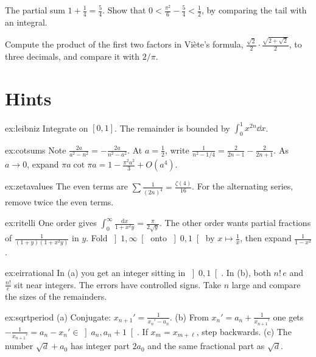 \begin{exercise}[$\star\star$]\label{ex:rw03c}
The partial sum $1+\frac14=\frac54$. Show that $0<\frac{\pi^2}6-\frac54<\frac12$, by comparing the tail with an integral.
\end{exercise}

\begin{exercise}[$\star\star\star$]\label{ex:rw03d}
Compute the product of the first two factors in Vi\`ete's formula, $\frac{\sqrt2}2\cdot\frac{\sqrt{2+\sqrt2}}2$, to three decimals, and compare it with $2/\pi$.
\end{exercise}

\section{Hints}

\begin{hint}{ex:leibniz}
Integrate on $[0,1]$. The remainder is bounded by $\int_0^1x^{2n}\dd x$.
\end{hint}
\begin{hint}{ex:cotsums}
Note $\frac{2a}{a^2-n^2}=-\frac{2a}{n^2-a^2}$. At $a=\frac12$, write $\frac1{n^2-1/4}=\frac2{2n-1}-\frac2{2n+1}$. As $a\to0$, expand $\pi a\cot\pi a=1-\frac{\pi^2a^2}3+O(a^4)$.
\end{hint}
\begin{hint}{ex:zetavalues}
The even terms are $\sum\frac1{(2n)^4}=\frac{\zeta(4)}{16}$. For the alternating series, remove twice the even terms.
\end{hint}
\begin{hint}{ex:ritelli}
One order gives $\int_0^\infty\frac{\mathrm dx}{1+x^2y}=\frac\pi{2\sqrt y}$. The other order wants partial fractions of $\frac1{(1+y)(1+x^2y)}$ in $y$. Fold $\left]1,\infty\right[$ onto $\left]0,1\right[$ by $x\mapsto\frac1x$, then expand $\frac1{1-x^2}$.
\end{hint}
\begin{hint}{ex:eirrational}
In (a) you get an integer sitting in $\left]0,1\right[$. In (b), both $n!\,e$ and $\frac{n!}e$ sit near integers. The errors have controlled signs. Take $n$ large and compare the sizes of the remainders.
\end{hint}
\begin{hint}{ex:sqrtperiod}
(a) Conjugate: $x_{n+1}'=\frac1{x_n'-a_n}$. (b) From $x_n'=a_n+\frac1{x_{n+1}'}$ one gets $-\frac1{x_{n+1}'}=a_n-x_n'\in\left]a_n,a_n+1\right[$. If $x_m=x_{m+\ell}$, step backwards. (c) The number $\sqrt d+a_0$ has integer part $2a_0$ and the same fractional part as $\sqrt d$.
\end{hint}

